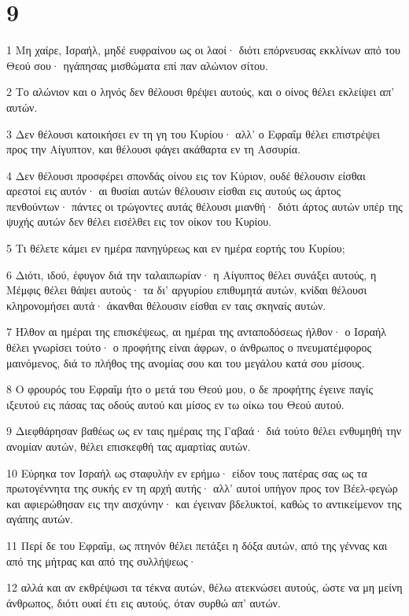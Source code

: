 \chapter{9}

\par 1 Μη χαίρε, Ισραήλ, μηδέ ευφραίνου ως οι λαοί· διότι επόρνευσας εκκλίνων από του Θεού σου· ηγάπησας μισθώματα επί παν αλώνιον σίτου.
\par 2 Το αλώνιον και ο ληνός δεν θέλουσι θρέψει αυτούς, και ο οίνος θέλει εκλείψει απ' αυτών.
\par 3 Δεν θέλουσι κατοικήσει εν τη γη του Κυρίου· αλλ' ο Εφραΐμ θέλει επιστρέψει προς την Αίγυπτον, και θέλουσι φάγει ακάθαρτα εν τη Ασσυρία.
\par 4 Δεν θέλουσι προσφέρει σπονδάς οίνου εις τον Κύριον, ουδέ θέλουσιν είσθαι αρεστοί εις αυτόν· αι θυσίαι αυτών θέλουσιν είσθαι εις αυτούς ως άρτος πενθούντων· πάντες οι τρώγοντες αυτάς θέλουσι μιανθή· διότι άρτος αυτών υπέρ της ψυχής αυτών δεν θέλει εισέλθει εις τον οίκον του Κυρίου.
\par 5 Τι θέλετε κάμει εν ημέρα πανηγύρεως και εν ημέρα εορτής του Κυρίου;
\par 6 Διότι, ιδού, έφυγον διά την ταλαιπωρίαν· η Αίγυπτος θέλει συνάξει αυτούς, η Μέμφις θέλει θάψει αυτούς· τα δι' αργυρίου επιθυμητά αυτών, κνίδαι θέλουσι κληρονομήσει αυτά· άκανθαι θέλουσιν είσθαι εν ταις σκηναίς αυτών.
\par 7 Ήλθον αι ημέραι της επισκέψεως, αι ημέραι της ανταποδόσεως ήλθον· ο Ισραήλ θέλει γνωρίσει τούτο· ο προφήτης είναι άφρων, ο άνθρωπος ο πνευματέμφορος μαινόμενος, διά το πλήθος της ανομίας σου και του μεγάλου κατά σου μίσους.
\par 8 Ο φρουρός του Εφραΐμ ήτο ο μετά του Θεού μου, ο δε προφήτης έγεινε παγίς ιξευτού εις πάσας τας οδούς αυτού και μίσος εν τω οίκω του Θεού αυτού.
\par 9 Διεφθάρησαν βαθέως ως εν ταις ημέραις της Γαβαά· διά τούτο θέλει ενθυμηθή την ανομίαν αυτών, θέλει επισκεφθή τας αμαρτίας αυτών.
\par 10 Εύρηκα τον Ισραήλ ως σταφυλήν εν ερήμω· είδον τους πατέρας σας ως τα πρωτογέννητα της συκής εν τη αρχή αυτής· αλλ' αυτοί υπήγον προς τον Βέελ-φεγώρ και αφιερώθησαν εις την αισχύνην· και έγειναν βδελυκτοί, καθώς το αντικείμενον της αγάπης αυτών.
\par 11 Περί δε του Εφραΐμ, ως πτηνόν θέλει πετάξει η δόξα αυτών, από της γέννας και από της μήτρας και από της συλλήψεως·
\par 12 αλλά και αν εκθρέψωσι τα τέκνα αυτών, θέλω ατεκνώσει αυτούς, ώστε να μη μείνη άνθρωπος, διότι ουαί έτι εις αυτούς, όταν συρθώ απ' αυτών.
